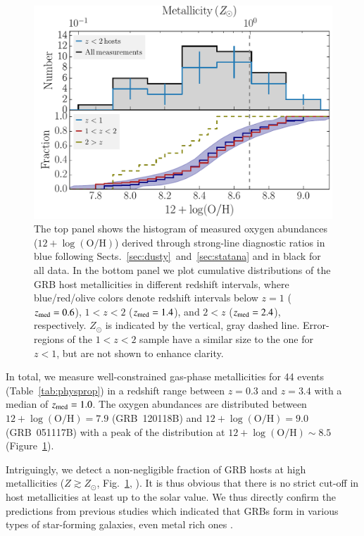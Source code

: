 \documentclass[traditabstract, longauth]{aa}
\newcommand{\oh}{12+\log(\mathrm{O/H})}
\begin{document}
\begin{figure}
\includegraphics[angle=0, width=0.99\columnwidth]{Figs/Z_histogram.pdf}
\caption{The top panel shows the histogram of measured oxygen abundances ($\oh$) derived through strong-line diagnostic ratios in blue following Sects.~\ref{sec:dusty}~and~\ref{sec:statana} and in black for all data. In the bottom panel we plot cumulative distributions of the GRB host metallicities in different redshift intervals, where blue/red/olive colors denote redshift intervals below $z=1$ ($z_{\rm{med}}=0.6$), $1<z<2$ ($z_{\rm{med}}=1.4$), and $2<z$ ($z_{\rm{med}}=2.4$), respectively. $Z_{\odot}$ is indicated by the vertical, gray dashed line. Error-regions of the $1<z<2$ sample have a similar size to the one for $z<1$, but are not shown to enhance clarity.}
\label{fig:zhist}
\end{figure}

In total, we measure well-constrained gas-phase metallicities for 44 events (Table~\ref{tab:physprop}) in a redshift range between $z=0.3$ and $z=3.4$ with a median of $z_{\rm {med}}=1.0$. The oxygen abundances are distributed between $\oh=7.9$ (GRB~120118B) and $\oh=9.0$ (GRB~051117B) with a peak of the distribution at $\oh \sim 8.5$ (Figure~\ref{fig:zhist}). 

Intriguingly, we detect a non-negligible fraction of GRB hosts at high metallicities ($Z\gtrsim Z_{\odot}$, Fig.~\ref{fig:zhist}, \citealp[see also][]{2010ApJ...712L..26L, 2013A&A...556A..23E}). It is thus obvious that there is no strict cut-off in host metallicities at least up to the solar value. We thus directly confirm the predictions from previous studies which indicated that GRBs form in various types of star-forming galaxies, even metal rich ones \citep{2007ApJ...660..504B, 2011A&A...534A.108K, 2013ApJ...778..128P, 2015arXiv150402479P}.
\end{document}
